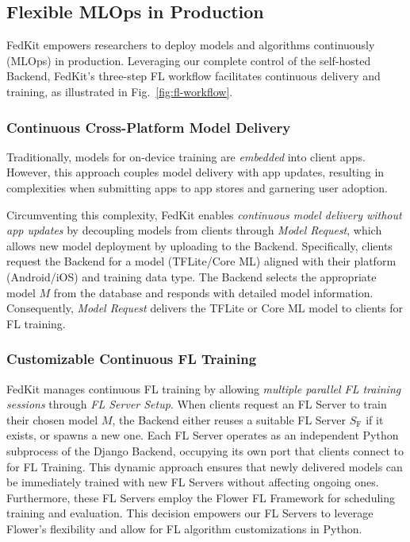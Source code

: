 \documentclass[conference]{IEEEtran}
\begin{document}
\subsection{Flexible MLOps in Production}
\newcommand{\model}{$M$}
\newcommand{\fs}{$S_\mathrm F$}
FedKit empowers researchers to deploy models and algorithms continuously (MLOps)
in production.
Leveraging our complete control of the self-hosted Backend,
FedKit's three-step FL workflow
facilitates continuous delivery and training,
as illustrated in Fig.~\ref{fig:fl-workflow}.
\subsubsection{Continuous Cross-Platform Model Delivery}
Traditionally, models for on-device training are \textit{embedded} into client apps.
However, this approach couples model delivery with app updates,
resulting in complexities when submitting apps to app stores and garnering user adoption.

Circumventing this complexity,
FedKit enables \textit{continuous model delivery without app updates} by
decoupling models from clients through \textit{Model Request},
which allows new model deployment by uploading to the Backend.
Specifically, clients request the Backend for a model (TFLite/Core ML)
aligned with
their platform (Android/iOS) and training data type.
The Backend selects the appropriate model \model{} from the database and
responds with detailed model information.
Consequently, \textit{Model Request} delivers the TFLite or Core ML model
to clients for FL training.

\subsubsection{Customizable Continuous FL Training}
FedKit manages continuous FL training by allowing \textit{multiple parallel FL training sessions}
through \textit{FL Server Setup}.
When clients request an FL Server to
train their chosen model \model{},
the Backend either reuses a suitable FL Server \fs{} if it exists,
or spawns a new one.
Each FL Server
operates as an independent Python subprocess of the Django Backend,
occupying its own port that
clients connect to for FL Training.
This dynamic approach ensures that
newly delivered models can be immediately trained with new FL Servers
without affecting ongoing ones.
Furthermore,
these FL Servers employ the Flower FL Framework for
scheduling training and evaluation.
This decision empowers our FL Servers to leverage Flower's flexibility and
allow for FL algorithm customizations in Python.
\end{document}
